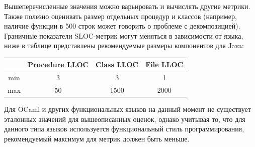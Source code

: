 Вышеперечисленные значения можно варьировать и вычислять другие метрики. Также полезно оценивать размер отдельных процедур и классов (например, наличие функции в 500 строк может говорить о проблеме с декомпозицией). Граничные
показатели SLOC-метрик могут меняться в зависимости от языка, ниже в таблице  представлены рекомендуемые размеры компонентов для Java: 
\begin{center}
\begin{tabular}{ | c | c | c | c | }
\hline
    & Procedure LLOC &  Class LLOC & File LLOC \\ \hline 
min & 3         & 3      & 1 \\  \hline
max & 50        & 1500   & 2000\\ \hline
\end{tabular}
\end{center}

Для OCaml и других функциональных языков на данный момент не существует 
эталонных значений для вышеописанных оценок, однако учитывая то, что для данного типа языков используется функциональный стиль программирования, рекомендуемый максимум для метрик должен быть меньше.
